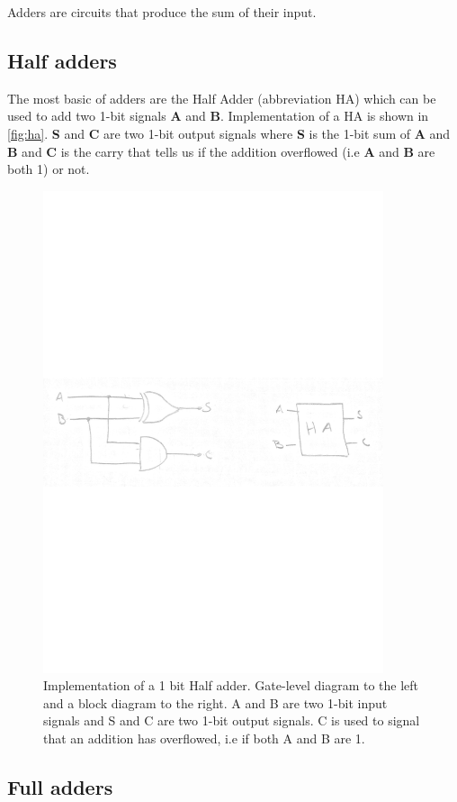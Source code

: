 \documentclass[a4paper,11pt]{report}
\begin{document}
Adders are circuits that produce the sum of their input.

\subsection{Half adders}

The most basic of adders are the Half Adder (abbreviation HA) which
can be used to add two 1-bit signals \textbf{A} and
\textbf{B}. Implementation of a HA is shown in
\autoref{fig:ha}. \textbf{S} and \textbf{C} are two 1-bit output
signals where \textbf{S} is the 1-bit sum of \textbf{A} and \textbf{B}
and \textbf{C} is the carry that tells us if the addition overflowed
(i.e \textbf{A} and \textbf{B} are both 1) or not.

\begin{figure}[H]
  \centering
  \includegraphics[width=10cm]{images/HA.pdf}
  \caption{Implementation of a 1 bit Half adder. Gate-level diagram to
    the left and a block diagram to the right. A and B are two 1-bit
    input signals and S and C are two 1-bit output signals. C is used
    to signal that an addition has overflowed, i.e if both A and B are
    1.}
  \label{fig:ha}
\end{figure}

\subsection{Full adders}
\end{document}
